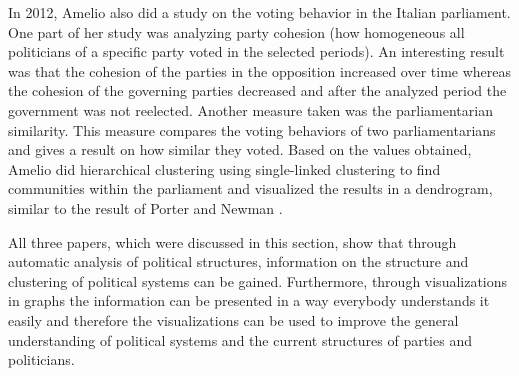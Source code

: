 In 2012, Amelio \cite{Amelio_2012} also did a study on the voting behavior in the Italian parliament. One part of her study was analyzing party cohesion (how homogeneous all politicians of a specific party voted in the selected periods). An interesting result was that the cohesion of the parties in the opposition increased over time whereas the cohesion of the governing parties decreased and after the analyzed period the government was not reelected. Another measure taken was the parliamentarian similarity. This measure compares the voting behaviors of two parliamentarians and gives a result on how similar they voted. Based on the values obtained, Amelio did hierarchical clustering using single-linked clustering to find communities within the parliament and visualized the results in a dendrogram, similar to the result of Porter and Newman \cite{Porter_2005}. 

All three papers, which were discussed in this section, show that through automatic analysis of political structures, information on the structure and clustering of political systems can be gained. Furthermore, through visualizations in graphs the information can be presented in a way everybody understands it easily and therefore the visualizations can be used to improve the general understanding of political systems and the current structures of parties and politicians.


